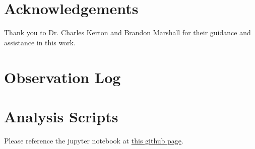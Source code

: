 \documentclass[%
aip,
jmp,
reprint,
floatfix,
nofootinbib
]{revtex4-1}
\begin{document}
	
	\section*{Acknowledgements}
	
	Thank you to Dr. Charles Kerton and Brandon Marshall for their guidance and assistance in this work.
	
	\medskip
	
	
	
	
	\onecolumngrid
	\appendix
	\section{Observation Log}

	\begin{table}[h!]
		\centering
		
		\label{table:log1}
	\end{table}

	\begin{table}[h!]
		\centering
		
		\label{table:log2}
	\end{table}
	
	\section{Analysis Scripts}
	
	Please reference the jupyter notebook at \href{https://github.com/mileslucas/astro344l/blob/master/project/src/project.ipynb}{this github page}.
\end{document}
